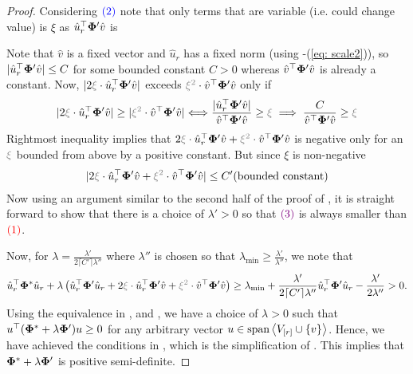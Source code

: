 \begin{proof}
    Considering $\textcolor{blue}{(2)}$ note that only terms that are variable (i.e. could change value) is $\xi$ as $\hat{u}_r^{\top} \boldsymbol{\Phi}' \hat{v}$ is 

    Note that $\hat{v}$ is a fixed vector and $\hat{u}_r$ has a fixed norm (using -(\ref{eq: scale2})), so $|\hat{u}_r^{\top} \boldsymbol{\Phi}' \hat{v}| \le C$ for some bounded constant $C > 0$ whereas $\hat{v}^{\top}\boldsymbol{\Phi}'\hat{v}$ is already a constant. Now, $|2 \textcolor{gray}{\xi}\cdot \hat{u}_r^{\top} \pphi' \hat{v}|$ exceeds $\textcolor{gray}{\xi^2}\cdot \hat{v}^{\top}\pphi'\hat{v}$ only if
    \begin{align*}
        |2 \textcolor{gray}{\xi}\cdot \hat{u}_r^{\top} \pphi' \hat{v}| \ge |\textcolor{gray}{\xi^2}\cdot \hat{v}^{\top}\pphi'\hat{v}| %
        \Longleftrightarrow \frac{|\hat{u}_r^{\top} \pphi' \hat{v}|}{\hat{v}^{\top}\pphi'\hat{v}} \ge \textcolor{gray}{\xi} \implies \frac{C}{\hat{v}^{\top}\pphi'\hat{v}} \ge \textcolor{gray}{\xi}
    \end{align*}
    Rightmost inequality implies that $2 \textcolor{gray}{\xi}\cdot \hat{u}_r^{\top} \pphi' \hat{v} + \textcolor{gray}{\xi^2}\cdot \hat{v}^{\top}\pphi'\hat{v}$ is negative only for an $\textcolor{gray}{\xi}$ bounded from above by a positive constant. But since $\xi$ is non-negative 
    \begin{align*}
        |2 \textcolor{gray}{\xi}\cdot \hat{u}_r^{\top} \pphi' \hat{v} + \textcolor{gray}{\xi^2}\cdot \hat{v}^{\top}\pphi'\hat{v}| \le C' (\textnormal{bounded constant})
    \end{align*}
    Now using an argument similar to the second half of the proof of , it is straight forward to show that there is a choice of $\lambda' > 0$ so that $\textcolor{violet}{(3)}$ is always smaller than $\textcolor{red}{(1)}$.

    Now, for $\lambda = \frac{\lambda'}{2\lceil C' \rceil \lambda''}$ where $\lambda''$ is chosen so that $\lambda_{\min} \ge \frac{\lambda'}{\lambda''}$, we note that
    \begin{align*}
        \hat{u}_r^{\top}\pphi^*\hat{u}_r + \lambda\paren{ \hat{u}_r^{\top}\pphi'\hat{u}_r + 2 \textcolor{gray}{\xi}\cdot \hat{u}_r^{\top} \pphi' \hat{v} + \textcolor{gray}{\xi^2}\cdot \hat{v}^{\top}\pphi'\hat{v} } \ge \lambda_{\min} + \frac{\lambda'}{2\lceil C' \rceil \lambda''} \hat{u}_r^{\top}\pphi'\hat{u}_r -\frac{\lambda'}{2\lambda''} >  0.
    \end{align*}
    Using the equivalence in ,  and , we have a choice of $\lambda > 0$ such that $u^{\top}(\boldsymbol{\Phi}^* + \lambda \boldsymbol{\Phi}')u \ge 0$ for any arbitrary vector $u \in \text{span}\left<V_{[r]} \cup \left\{v\right\}\right>$. Hence, we have achieved the conditions in , which is the simplification of . This implies that $\boldsymbol{\Phi}^* + \lambda \boldsymbol{\Phi}'$ is positive semi-definite. 
    

\end{proof}
